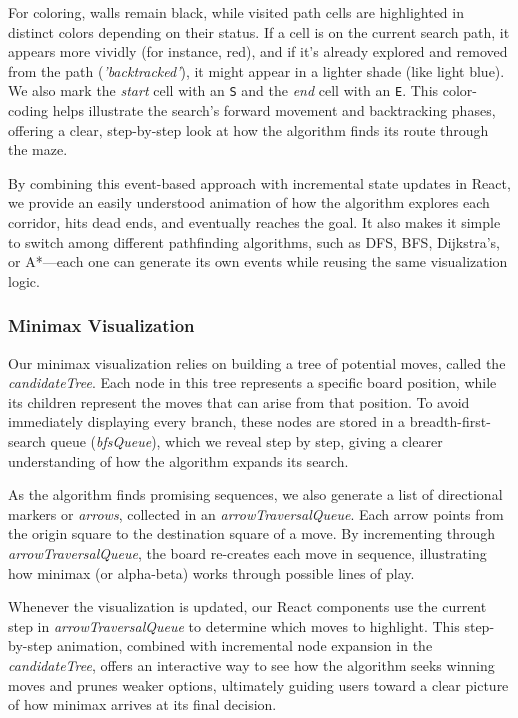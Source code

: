 \documentclass[12pt,a4paper]{article}
\begin{document}
For coloring, walls remain black, while visited path cells are highlighted 
in distinct colors depending on their status. If a cell is on the current 
search path, it appears more vividly (for instance, red), and if it’s 
already explored and removed from the path (\emph{'backtracked'}), it might 
appear in a lighter shade (like light blue). We also mark the \emph{start} 
cell with an \texttt{S} and the \emph{end} cell with an \texttt{E}. This 
color-coding helps illustrate the search’s forward movement and backtracking 
phases, offering a clear, step-by-step look at how the algorithm finds its 
route through the maze. 

By combining this event-based approach with incremental state updates in 
React, we provide an easily understood animation of how the algorithm 
explores each corridor, hits dead ends, and eventually reaches the goal. 
It also makes it simple to switch among different pathfinding algorithms, 
such as DFS, BFS, Dijkstra’s, or A*—each one can generate its own events 
while reusing the same visualization logic.

\subsubsection{Minimax Visualization}

Our minimax visualization relies on building a tree of potential moves, 
called the \emph{candidateTree}. Each node in this tree represents a 
specific board position, while its children represent the moves that 
can arise from that position. To avoid immediately displaying every 
branch, these nodes are stored in a breadth-first-search queue (\emph{bfsQueue}), 
which we reveal step by step, giving a clearer understanding of how the 
algorithm expands its search.

As the algorithm finds promising sequences, we also generate a list of 
directional markers or \emph{arrows}, collected in an \emph{arrowTraversalQueue}. 
Each arrow points from the origin square to the destination square of a 
move. By incrementing through \emph{arrowTraversalQueue}, the board 
re-creates each move in sequence, illustrating how minimax (or alpha-beta) 
works through possible lines of play. 

Whenever the visualization is updated, our React components use the 
current step in \emph{arrowTraversalQueue} to determine which moves to 
highlight. This step-by-step animation, combined with incremental node 
expansion in the \emph{candidateTree}, offers an interactive way to see 
how the algorithm seeks winning moves and prunes weaker options, 
ultimately guiding users toward a clear picture of how minimax arrives 
at its final decision.
\end{document}
